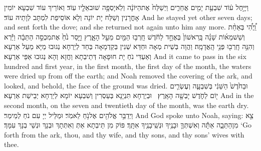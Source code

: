 {וַיִּיָּ֣חֶל ע֔וֹד שִׁבְעַ֥ת יָמִ֖ים אֲחֵרִ֑ים וַיְשַׁלַּח֙ אֶת\maqqaf הַיּוֹנָ֔ה וְלֹֽא\maqqaf יָסְפָ֥ה שׁוּב\maqqaf אֵלָ֖יו עֽוֹד׃}
{וְאוֹרֵיךְ עוֹד שִׁבְעָא יוֹמִין אָחֳרָנִין וְשַׁלַּח יָת יוֹנָה וְלָא אוֹסֵיפַת לִמְתָּב לְוָתֵיהּ עוֹד׃}
{And he stayed yet other seven days; and sent forth the dove; and she returned not again unto him any more.}{}
{וַֽ֠יְהִ֠י בְּאַחַ֨ת וְשֵׁשׁ\maqqaf מֵא֜וֹת שָׁנָ֗ה בָּֽרִאשׁוֹן֙ בְּאֶחָ֣ד לַחֹ֔דֶשׁ חָֽרְב֥וּ הַמַּ֖יִם מֵעַ֣ל הָאָ֑רֶץ וַיָּ֤סַר נֹ֙חַ֙ אֶת\maqqaf מִכְסֵ֣ה הַתֵּבָ֔ה וַיַּ֕רְא וְהִנֵּ֥ה חָֽרְב֖וּ פְּנֵ֥י הָֽאֲדָמָֽה׃}
{וַהֲוָה בְּשֵׁית מְאָה וּחְדַּא שְׁנִין בְּקַדְמָאָה בְּחַד לְיַרְחָא נְגוּבוּ מַיָּא מֵעַל אַרְעָא וְאַעְדִּי נֹחַ יָת חוּפָאָה דְּתֵיבְתָא וַחֲזָא וְהָא נְגוּבוּ אַפֵּי אַרְעָא׃}
{And it came to pass in the six hundred and first year, in the first month, the first day of the month, the waters were dried up from off the earth; and Noah removed the covering of the ark, and looked, and behold, the face of the ground was dried.}{}
{וּבַחֹ֙דֶשׁ֙ הַשֵּׁנִ֔י בְּשִׁבְעָ֧ה וְעֶשְׂרִ֛ים י֖וֹם לַחֹ֑דֶשׁ יָבְשָׁ֖ה הָאָֽרֶץ׃ \setuma }
{וּבְיַרְחָא תִּנְיָנָא בְּעַסְרִין וְשִׁבְעָא יוֹמָא לְיַרְחָא יְבֵישַׁת אַרְעָא׃}
{And in the second month, on the seven and twentieth day of the month, was the earth dry.}{}
{וַיְדַבֵּ֥ר אֱלֹהִ֖ים אֶל\maqqaf נֹ֥חַ לֵאמֹֽר׃}
{וּמַלֵּיל יְיָ עִם נֹחַ לְמֵימַר׃}
{And God spoke unto Noah, saying:}{}
{צֵ֖א מִן\maqqaf הַתֵּבָ֑ה אַתָּ֕ה וְאִשְׁתְּךָ֛ וּבָנֶ֥יךָ וּנְשֵֽׁי\maqqaf בָנֶ֖יךָ אִתָּֽךְ׃}
{פּוֹק מִן תֵּיבְתָא אַתְּ וְאִתְּתָךְ וּבְנָךְ וּנְשֵׁי בְנָךְ עִמָּךְ׃}
{‘Go forth from the ark, thou, and thy wife, and thy sons, and thy sons’  wives with thee.}{}
